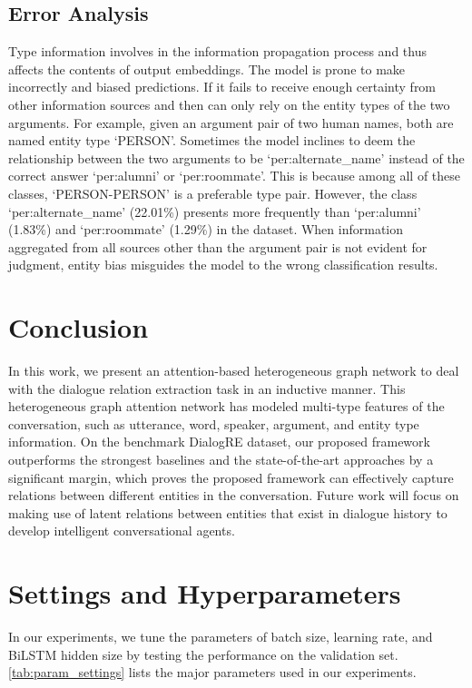 \documentclass[11pt]{article}
\begin{document}
\subsection{Error Analysis}
Type information involves in the information propagation process and thus affects the contents of output embeddings.
The model is prone to make incorrectly and biased predictions.
If it fails to receive enough certainty from other information sources and then can only rely on the entity types of the two arguments.
For example, given an argument pair of two human names, both are named entity type `PERSON'.
Sometimes the model inclines to deem the relationship between the two arguments to be `per:alternate\_name' instead of the correct answer `per:alumni' or `per:roommate'.
This is because among all of these classes, `PERSON-PERSON' is a preferable type pair.
However, the class `per:alternate\_name' (22.01\%) presents more frequently than `per:alumni' (1.83\%) and `per:roommate' (1.29\%) in the dataset. When information aggregated from all sources other than the argument pair is not evident for judgment, entity bias misguides the model to the wrong classification results.


\section{Conclusion}
\label{conclusion}
In this work, we present an attention-based heterogeneous graph network to deal with the dialogue relation extraction task in an inductive manner. This heterogeneous graph attention network has modeled multi-type features of the conversation, such as utterance, word, speaker, argument, and entity type information. On the benchmark DialogRE dataset, our proposed framework outperforms the strongest baselines and the state-of-the-art approaches by a significant margin, which proves the proposed framework can effectively capture relations between different entities in the conversation. Future work will focus on making use of latent relations between entities that exist in dialogue history to develop intelligent conversational agents.




\clearpage

\appendix


\section{Settings and Hyperparameters}
\label{sec:appendix1}
In our experiments, we tune the parameters of batch size, learning rate, and BiLSTM hidden size by testing the performance on the validation set. \cref{tab:param_settings} lists the major parameters used in our experiments.
\end{document}
